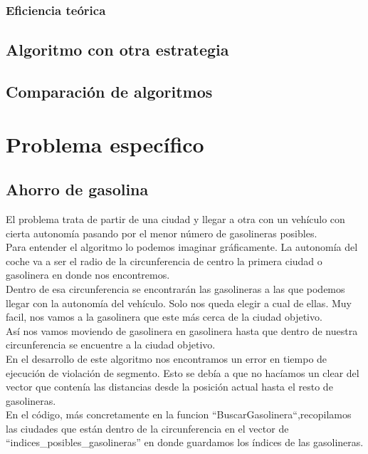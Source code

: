 \documentclass[11pt,a4paper]{article} %
\begin{document}
\subsubsection{Eficiencia teórica}


\newpage
\subsection{Algoritmo con otra estrategia}


\newpage
\subsection{Comparación de algoritmos}


\newpage
\section{Problema específico}
\subsection{Ahorro de gasolina}
El problema trata de partir de una ciudad y llegar a otra con un vehículo con cierta autonomía pasando por el menor número de gasolineras posibles.\\

Para entender el algoritmo lo podemos imaginar gráficamente. La autonomía del coche va a ser el radio de la circunferencia de centro la primera ciudad o gasolinera en donde nos encontremos.\\

Dentro de esa circunferencia se encontrarán las gasolineras a las que podemos llegar con la autonomía del vehículo. Solo nos queda elegir a cual de ellas. Muy facil, nos vamos a la gasolinera que este más cerca de la ciudad objetivo. \\

Así nos vamos moviendo de gasolinera en gasolinera hasta que dentro de nuestra circunferencia se encuentre a la ciudad objetivo.\\

En el desarrollo de este algoritmo nos encontramos un error en tiempo de ejecución de violación de segmento. Esto se debía a que no hacíamos un clear del vector que contenía las distancias desde la posición actual hasta el resto de gasolineras.\\

En el código, más concretamente en la funcion “BuscarGasolinera“,recopilamos las ciudades que están dentro de la circunferencia en el vector de “indices\_posibles\_gasolineras” en donde guardamos los índices de las gasolineras.\\
\end{document}
